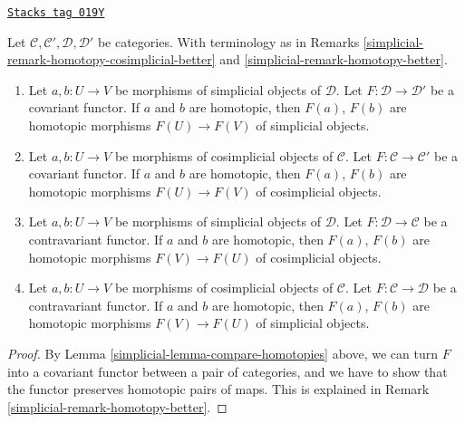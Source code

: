 \begin{lemma}
\label{simplicial-lemma-functorial-homotopy}
\href{https://stacks.math.columbia.edu/tag/019Y}{\texttt{Stacks tag 019Y}}


Let $\mathcal{C}, \mathcal{C}', \mathcal{D}, \mathcal{D}'$ be categories.
With terminology as in Remarks \ref{simplicial-remark-homotopy-cosimplicial-better} and
\ref{simplicial-remark-homotopy-better}.
\begin{enumerate}
\item Let $a, b : U \to V$ be morphisms of simplicial objects
of $\mathcal{D}$. Let $F : \mathcal{D} \to \mathcal{D}'$ be a covariant
functor. If $a$ and $b$ are homotopic, then $F(a)$, $F(b)$
are homotopic morphisms $F(U) \to F(V)$ of simplicial objects.
\item Let $a, b : U \to V$ be morphisms of cosimplicial objects
of $\mathcal{C}$. Let $F : \mathcal{C} \to \mathcal{C}'$ be a covariant
functor. If $a$ and $b$ are homotopic, then $F(a)$, $F(b)$
are homotopic morphisms $F(U) \to F(V)$ of cosimplicial objects.
\item Let $a, b : U \to V$ be morphisms of simplicial objects of $\mathcal{D}$.
Let $F : \mathcal{D} \to \mathcal{C}$ be a contravariant
functor. If $a$ and $b$ are homotopic, then $F(a)$, $F(b)$
are homotopic morphisms $F(V) \to F(U)$ of cosimplicial objects.
\item Let $a, b : U \to V$ be morphisms of cosimplicial objects of
$\mathcal{C}$.
Let $F : \mathcal{C} \to \mathcal{D}$ be a contravariant
functor. If $a$ and $b$ are homotopic, then $F(a)$, $F(b)$
are homotopic morphisms $F(V) \to F(U)$ of simplicial objects.
\end{enumerate}
\end{lemma}

\begin{proof}

By Lemma \ref{simplicial-lemma-compare-homotopies} above, we can
turn $F$ into a covariant functor between a pair of
categories, and we have to show that the functor preserves homotopic pairs
of maps. This is explained in Remark \ref{simplicial-remark-homotopy-better}.
\end{proof}

